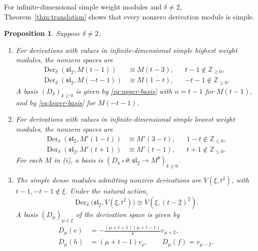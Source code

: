 \documentclass[11pt,reqno]{amsart}
\numberwithin{equation}{section}
\newcommand{\Z}{\mathbb Z}
\newcommand{\s}{\mathfrak{sl}_2}
\DeclareMathOperator{\Der}{Der}
\newtheorem{proposition}[theorem]{Proposition}
\theoremstyle{definition}
\theoremstyle{remark}
\begin{document}
For infinite-dimensional simple weight modules and \(\delta\ne2\),
Theorem~\ref{thm:translation} shows that every nonzero derivation
module is simple.

\begin{proposition}\label{prop:weight-regular}
Suppose \(\delta\ne2\).
\begin{enumerate}
\item For derivations with values in infinite-dimensional simple
highest weight modules, the nonzero spaces are
\begin{equation}\label{eq:verma-table}
\begin{aligned}
\Der_\delta(\s,M(t-1))&\cong M(t-3),
&&t-1\notin\Z_{\ge0},\\
\Der_\delta(\s,M(-t-1))&\cong M(1-t),
&&-t-1\notin\Z_{\ge0}.
\end{aligned}
\end{equation}
A basis \((D_k)_{k\ge0}\) is given by \eqref{eq:upper-basis} with
\(n=t-1\) for \(M(t-1)\), and by \eqref{eq:lower-basis} for
\(M(-t-1)\).
\item For derivations with values in infinite-dimensional simple
lowest weight modules, the nonzero spaces are
\begin{equation}\label{eq:lowest-table}
\begin{aligned}
\Der_\delta(\s,M'(1-t))&\cong M'(3-t),
&&1-t\notin\Z_{\le0},\\
\Der_\delta(\s,M'(t+1))&\cong M'(t-1),
&&t+1\notin\Z_{\le0}.
\end{aligned}
\end{equation}
For each \(M\) in \textup{(i)}, a basis is
\((D_k\circ\theta:\s\to M^\theta)_{k\ge0}\).
\item The simple dense modules admitting nonzero derivations are
\(V(\xi,t^2)\), with \(t-1,-t-1\notin\xi\). Under the natural action,
\begin{equation}\label{eq:dense-answer}
\Der_\delta\bigl(\s,V(\xi,t^2)\bigr)
\cong V(\xi,(t-2)^2).
\end{equation}
A basis \((D_\mu)_{\mu\in\xi}\) of the derivation space is given by
\begin{equation}\label{eq:dense-general-D}
\begin{aligned}
D_\mu(e)&=-\frac{(\mu+t+1)(\mu+t-1)}{4}v_{\mu+2},\\
D_\mu(h)&=(\mu+t-1)v_\mu,\qquad
D_\mu(f)=v_{\mu-2}.
\end{aligned}
\end{equation}
\end{enumerate}
\end{proposition}
\end{document}

